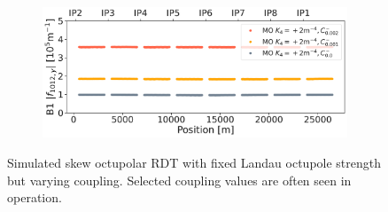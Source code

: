 \begin{figure}[!htb]
    \centering
    \begin{subfigure}{0.8\textwidth}
        \includegraphics[width=\textwidth]{./images/skew_octupoles/f1012_coupling_sim_AMP.pdf}
    \end{subfigure}
    \caption{Simulated skew octupolar RDT with fixed Landau octupole strength but varying coupling.
    Selected coupling values are often seen in operation.}
    \label{fig:skew_octupolar:sim_coupling}
\end{figure}



\FloatBarrier
\subsubsection{}


